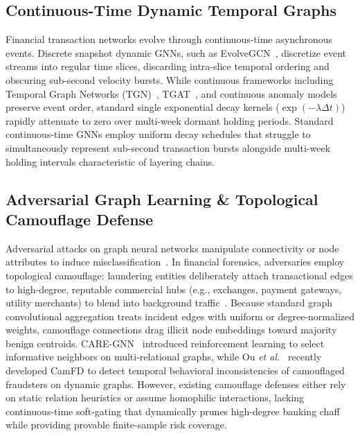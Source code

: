 \subsection{Continuous-Time Dynamic Temporal Graphs}
Financial transaction networks evolve through continuous-time asynchronous events. Discrete snapshot dynamic GNNs, such as EvolveGCN~\cite{pareja2020evolvegcn}, discretize event streams into regular time slices, discarding intra-slice temporal ordering and obscuring sub-second velocity bursts. While continuous frameworks including Temporal Graph Networks (TGN)~\cite{rossi2020temporal}, TGAT~\cite{xu2020inductive}, and continuous anomaly models~\cite{wang2024temporal} preserve event order, standard single exponential decay kernels ($\exp(-\lambda \Delta t)$) rapidly attenuate to zero over multi-week dormant holding periods. Standard continuous-time GNNs employ uniform decay schedules that struggle to simultaneously represent sub-second transaction bursts alongside multi-week holding intervals characteristic of layering chains.

\subsection{Adversarial Graph Learning \& Topological Camouflage Defense}
Adversarial attacks on graph neural networks manipulate connectivity or node attributes to induce misclassification~\cite{zugner2018adversarial}. In financial forensics, adversaries employ topological camouflage: laundering entities deliberately attach transactional edges to high-degree, reputable commercial hubs (e.g., exchanges, payment gateways, utility merchants) to blend into background traffic~\cite{dou2020enhancing}. Because standard graph convolutional aggregation treats incident edges with uniform or degree-normalized weights, camouflage connections drag illicit node embeddings toward majority benign centroids. CARE-GNN~\cite{dou2020enhancing} introduced reinforcement learning to select informative neighbors on multi-relational graphs, while Ou \textit{et al.}~\cite{ou2025camfd} recently developed CamFD to detect temporal behavioral inconsistencies of camouflaged fraudsters on dynamic graphs. However, existing camouflage defenses either rely on static relation heuristics or assume homophilic interactions, lacking continuous-time soft-gating that dynamically prunes high-degree banking chaff while providing provable finite-sample risk coverage.

